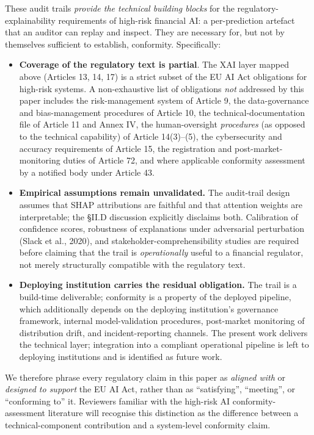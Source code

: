 \documentclass[conference]{IEEEtran}
\begin{document}
These audit trails \emph{provide the technical building blocks} for the regulatory-explainability requirements of high-risk financial AI: a per-prediction artefact that an auditor can replay and inspect. They are necessary for, but not by themselves sufficient to establish, conformity. Specifically:
\begin{itemize}
\item \textbf{Coverage of the regulatory text is partial}. The XAI layer mapped above (Articles 13, 14, 17) is a strict subset of the EU AI Act obligations for high-risk systems. A non-exhaustive list of obligations \emph{not} addressed by this paper includes the risk-management system of Article 9, the data-governance and bias-management procedures of Article 10, the technical-documentation file of Article 11 and Annex IV, the human-oversight \emph{procedures} (as opposed to the technical capability) of Article 14(3)--(5), the cybersecurity and accuracy requirements of Article 15, the registration and post-market-monitoring duties of Article 72, and where applicable conformity assessment by a notified body under Article 43.
\item \textbf{Empirical assumptions remain unvalidated.} The audit-trail design assumes that SHAP attributions are faithful and that attention weights are interpretable; the §II.D discussion explicitly disclaims both. Calibration of confidence scores, robustness of explanations under adversarial perturbation (Slack et al., 2020), and stakeholder-comprehensibility studies are required before claiming that the trail is \emph{operationally} useful to a financial regulator, not merely structurally compatible with the regulatory text.
\item \textbf{Deploying institution carries the residual obligation.} The trail is a build-time deliverable; conformity is a property of the deployed pipeline, which additionally depends on the deploying institution's governance framework, internal model-validation procedures, post-market monitoring of distribution drift, and incident-reporting channels. The present work delivers the technical layer; integration into a compliant operational pipeline is left to deploying institutions and is identified as future work.
\end{itemize}
We therefore phrase every regulatory claim in this paper as \emph{aligned with} or \emph{designed to support} the EU AI Act, rather than as ``satisfying'', ``meeting'', or ``conforming to'' it. Reviewers familiar with the high-risk AI conformity-assessment literature will recognise this distinction as the difference between a technical-component contribution and a system-level conformity claim.
\end{document}
